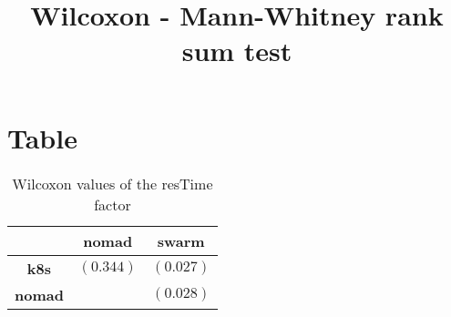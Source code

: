 \documentclass{article}
\title{Wilcoxon - Mann-Whitney rank sum test}
\author{}
\begin{document}
\maketitle
\section{Table}
\begin{table}[!htp]
  \caption{Wilcoxon values of the resTime factor}
  \label{table:resTime}
  \centering
  \begin{scriptsize}
  \begin{tabular}{c|cc}
      & \textbf{nomad} & \textbf{swarm} \\\hline
      \textbf{k8s} & $(0.344) $ & $ (0.027)$ \\
      \textbf{nomad} & $ $ & $ (0.028)$ \\
  \end{tabular}
  \end{scriptsize}
\end{table}
\end{document}
